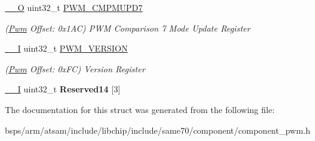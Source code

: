 \begin{DoxyCompactItemize}
\mbox{\label{structPwm_a3a9aaac8fb2adec09d13c71f178a8f1c}} 
\mbox{\hyperlink{core__cm7_8h_a7e25d9380f9ef903923964322e71f2f6}{\+\_\+\+\_\+O}} uint32\+\_\+t \mbox{\hyperlink{structPwm_a3a9aaac8fb2adec09d13c71f178a8f1c}{P\+W\+M\+\_\+\+C\+M\+P\+M\+U\+P\+D7}}
\begin{DoxyCompactList}\small\item\em (\mbox{\hyperlink{structPwm}{Pwm}} Offset\+: 0x1\+AC) P\+WM Comparison 7 Mode Update Register \end{DoxyCompactList}\item 
\mbox{\label{structPwm_a741f910ff2831e2a681790690bd3d4bf}} 
\mbox{\hyperlink{core__cm7_8h_af63697ed9952cc71e1225efe205f6cd3}{\+\_\+\+\_\+I}} uint32\+\_\+t \mbox{\hyperlink{structPwm_a741f910ff2831e2a681790690bd3d4bf}{P\+W\+M\+\_\+\+V\+E\+R\+S\+I\+ON}}
\begin{DoxyCompactList}\small\item\em (\mbox{\hyperlink{structPwm}{Pwm}} Offset\+: 0x\+FC) Version Register \end{DoxyCompactList}\item 
\mbox{\label{structPwm_af47082703620098927c27bd59f5490d3}} 
\mbox{\hyperlink{core__cm7_8h_af63697ed9952cc71e1225efe205f6cd3}{\+\_\+\+\_\+I}} uint32\+\_\+t {\bfseries Reserved14} \mbox{[}3\mbox{]}
\end{DoxyCompactItemize}


The documentation for this struct was generated from the following file\+:\begin{DoxyCompactItemize}
\item 
bsps/arm/atsam/include/libchip/include/same70/component/component\+\_\+pwm.\+h\end{DoxyCompactItemize}
